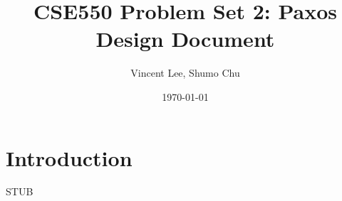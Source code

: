 \documentclass[11pt, onecolumn]{article}
\begin{document}
\title{CSE550 Problem Set 2: Paxos Design Document}
\author{Vincent Lee, Shumo Chu}
\date{\today}

\maketitle

\tableofcontents

\section{Introduction}

STUB
\end{document}
